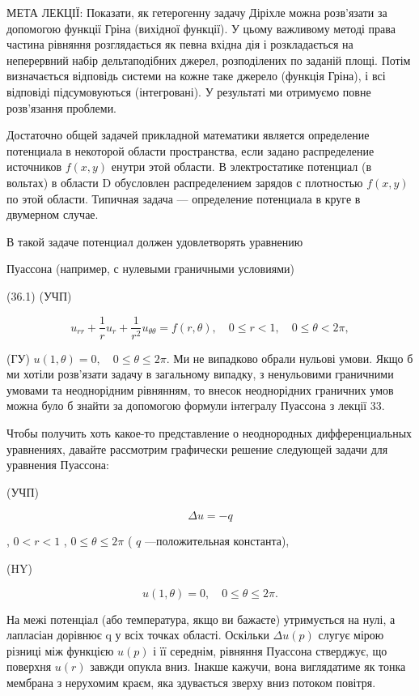 \documentclass[
  ukrainian,
]{article}
\begin{document}
МЕТА ЛЕКЦІЇ: Показати, як гетерогенну задачу Діріхле можна розв'язати за
допомогою функції Гріна (вихідної функції). У цьому важливому методі
права частина рівняння розглядається як певна вхідна дія і розкладається
на неперервний набір дельтаподібних джерел, розподілених по заданій
площі. Потім визначається відповідь системи на кожне таке джерело
(функція Гріна), і всі відповіді підсумовуються (інтегровані). У
результаті ми отримуємо повне розв'язання проблеми.

Достаточно общей задачей прикладной математики является определение
потенциала в некоторой области пространства, если задано распределение
источников \(f(x, y)\) енутри этой области. В электростатике потенциал
(в вольтах) в области D обусловлен распределением зарядов с плотностью
\(f(x, y)\) по этой области. Типичная задача --- определение потенциала
в круге в двумерном случае.

В такой задаче потенциал должен удовлетворять уравнению

Пуассона (например, с нулевыми граничными условиями)

(36.1) (УЧП)

\[
u_{rr} + \frac{1}{r} u_r + \frac{1}{r^2} u_{\theta\theta} = f(r, \theta), \quad 0 \le r < 1, \quad 0 \le \theta < 2\pi,
\]

(ГУ) \(u(1, \theta) = 0, \quad 0 \le \theta \le 2\pi.\) Ми не випадково
обрали нульові умови. Якщо б ми хотіли розв'язати задачу в загальному
випадку, з ненульовими граничними умовами та неоднорідним рівнянням, то
внесок неоднорідних граничних умов можна було б знайти за допомогою
формули інтегралу Пуассона з лекції 33.

Чтобы получить хоть какое-то представление о неоднородных
дифференциальных уравнениях, давайте рассмотрим графически решение
следующей задачи для уравнения Пуассона:

(УЧП)

\[
\Delta u = -q
\]

, \(0 < r < 1\) , \(0 \le \theta \le 2\pi\) ( \(q\) ---положительная
константа),

(HY)

\[
u(1, \theta) = 0, \quad 0 \le \theta \le 2\pi.
\]

На межі потенціал (або температура, якщо ви бажаєте) утримується на
нулі, а лапласіан дорівнює q у всіх точках області. Оскільки
\(\Delta u\left(p\right)\) слугує мірою різниці між функцією
\(u\left(p\right)\) і її середнім, рівняння Пуассона стверджує, що
поверхня \(u\left(r\right)\) завжди опукла вниз. Інакше кажучи, вона
виглядатиме як тонка мембрана з нерухомим краєм, яка здувається зверху
вниз потоком повітря.
\end{document}
